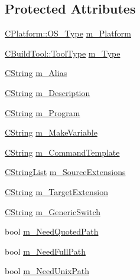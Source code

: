 \subsection*{Protected Attributes}
\begin{DoxyCompactItemize}
\item 
\hyperlink{classCPlatform_a2fb735c63c53052f79629e338bb0f535}{C\-Platform\-::\-O\-S\-\_\-\-Type} \hyperlink{classCBuildTool_ac71c95a56dbe26f62052dfff4f1c5c19}{m\-\_\-\-Platform}
\item 
\hyperlink{classCBuildTool_a1a622843617ddf9b0ebb1c09c3437e6d}{C\-Build\-Tool\-::\-Tool\-Type} \hyperlink{classCBuildTool_aca6ef29a8035174232c7b303ec5c51b1}{m\-\_\-\-Type}
\item 
\hyperlink{classCString}{C\-String} \hyperlink{classCBuildTool_a494ffa896b4101e77dda5f53954e0b71}{m\-\_\-\-Alias}
\item 
\hyperlink{classCString}{C\-String} \hyperlink{classCBuildTool_a366fc905a28c6b5d06f86830963fc2b7}{m\-\_\-\-Description}
\item 
\hyperlink{classCString}{C\-String} \hyperlink{classCBuildTool_af1a5473dde66a30d9aef8da074b8578f}{m\-\_\-\-Program}
\item 
\hyperlink{classCString}{C\-String} \hyperlink{classCBuildTool_a0dc54c7de4b25e7479bc8f025db697b7}{m\-\_\-\-Make\-Variable}
\item 
\hyperlink{classCString}{C\-String} \hyperlink{classCBuildTool_a2fa8d54915b30ee28de67d4928760967}{m\-\_\-\-Command\-Template}
\item 
\hyperlink{classCStringList}{C\-String\-List} \hyperlink{classCBuildTool_aca71945734de780a6b72f9aeb6e4a0c1}{m\-\_\-\-Source\-Extensions}
\item 
\hyperlink{classCString}{C\-String} \hyperlink{classCBuildTool_a358fae486209c5c9ee63d65e832bf815}{m\-\_\-\-Target\-Extension}
\item 
\hyperlink{classCString}{C\-String} \hyperlink{classCBuildTool_a7d7378e1398389dabb9e205c91a15c9b}{m\-\_\-\-Generic\-Switch}
\item 
bool \hyperlink{classCBuildTool_ad5ffb63aa12dc58c2305308e4f86486d}{m\-\_\-\-Need\-Quoted\-Path}
\item 
bool \hyperlink{classCBuildTool_ae4e23027052ad550bf8f0dbe04a96ae5}{m\-\_\-\-Need\-Full\-Path}
\item 
bool \hyperlink{classCBuildTool_a07c05a66337abb13b6c7cb3b577ac600}{m\-\_\-\-Need\-Unix\-Path}
\end{DoxyCompactItemize}


